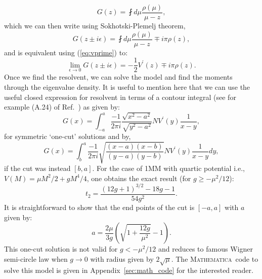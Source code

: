 \documentclass[11pt]{article}
\newcommand{\MA}{\textsc{Mathematica}}
\begin{document}
\begin{equation}
	G(z) = \fint d\mu \frac{\rho(\mu)}{\mu - z},
\end{equation}
which we can then write using Sokhotski-Plemelj theorem,
\begin{equation}
	G(z \pm i \epsilon) = \fint d\mu \frac{\rho(\mu)}{\mu - z} \mp i\pi \rho(z),  
\end{equation}
and is equivalent using (\ref{eq:vprime}) to: 
\begin{equation}
	\lim_{\epsilon \to 0} G(z \pm i \epsilon) = -\frac{1}{2} V^{\prime}(z) \mp i\pi \rho(z).  
\end{equation}
Once we find the resolvent, we can solve the model and find the moments through the eigenvalue density. 
It is useful to mention here that we can use the useful closed expression for 
resolvent in terms of a contour integral (see for example (A.24) of Ref.~\cite{Migdal:1983qrz})
as given by:
\begin{equation}
	G(x) = \int_{-a}^{a} \frac{-1}{2\pi i} \frac{\sqrt{x^2-a^2}}{\sqrt{y^2-a^2}} N V^{\prime}(y) \frac{1}{x-y}, 
\end{equation}
for symmetric `one-cut' solutions and by,
\begin{equation}
	G(x) = \int_{b}^{a} \frac{-1}{2\pi i} \sqrt{\frac{(x-a) (x-b)}{(y-a)(y-b)}}  N V^{\prime}(y) \frac{1}{x-y} dy, 
\end{equation}
if the cut was instead $[b,a]$. For the case of 1MM with quartic potential i.e., 
$V(M) = \mu M^2/2 + gM^4/4$, one obtains the exact result (for $g \ge -\mu^2/12$):
\begin{equation}
\label{eq:exact1MM} 
t_{2} = \frac{(12 g+1)^{3/2}-18 g-1}{54 g^2}. 
\end{equation}
It is straightforward to show that the end points of the cut is $[-a,a]$ with $a$ given by:
\begin{equation}
a = \frac{2\mu}{3g} \left( \sqrt{1 + \frac{12g}{\mu^2}} - 1\right). 
\end{equation}
This one-cut solution is not valid for $g < -\mu^2/12$ and reduces to famous Wigner semi-circle
law when $g \to 0$ with radius given by $2 \sqrt{\mu}$. The \MA~code to solve 
this model is given in Appendix~\ref{sec:math_code} for the interested reader. 
\end{document}
